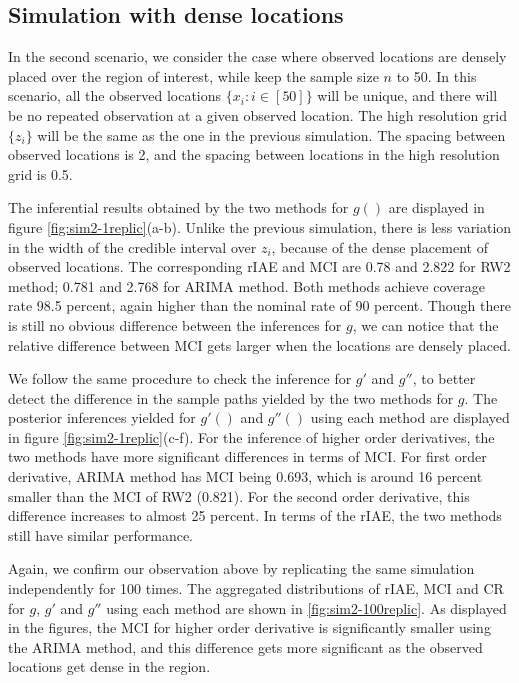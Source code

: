 \documentclass{article}
\begin{document}
\subsection{Simulation with dense locations}

In the second scenario, we consider the case where observed locations are densely placed over the region of interest, while keep the sample size $n$ to 50. In this scenario, all the observed locations $\{x_i: i\in [50]\}$ will be unique, and there will be no repeated observation at a given observed location. The high resolution grid $\{z_i\}$ will be the same as the one in the previous simulation. The spacing between observed locations is 2, and the spacing between locations in the high resolution grid is 0.5. 

The inferential results obtained by the two methods for $g()$ are displayed in figure \ref{fig:sim2-1replic}(a-b). Unlike the previous simulation, there is less variation in the width of the credible interval over $z_i$, because of the dense placement of observed locations. The corresponding rIAE and MCI are 0.78 and 2.822 for RW2 method; 0.781 and 2.768 for ARIMA method. Both methods achieve coverage rate 98.5 percent, again higher than the nominal rate of 90 percent. Though there is still no obvious difference between the inferences for $g$, we can notice that the relative difference between MCI gets larger when the locations are densely placed.

We follow the same procedure to check the inference for $g'$ and $g''$, to better detect the difference in the sample paths yielded by the two methods for $g$. The posterior inferences yielded for $g'()$ and $g''()$ using each method are displayed in figure \ref{fig:sim2-1replic}(c-f).
For the inference of higher order derivatives, the two methods have more significant differences in terms of MCI. For first order derivative, ARIMA method has MCI being 0.693, which is around 16 percent smaller than the MCI of RW2 (0.821). For the second order derivative, this difference increases to almost 25 percent. In terms of the rIAE, the two methods still have similar performance.

Again, we confirm our observation above by replicating the same simulation independently for 100 times. The aggregated distributions of rIAE, MCI and CR for $g$, $g'$ and $g''$ using each method are shown in \ref{fig:sim2-100replic}. As displayed in the figures, the MCI for higher order derivative is significantly smaller using the ARIMA method, and this difference gets more significant as the observed locations get dense in the region.
\end{document}
